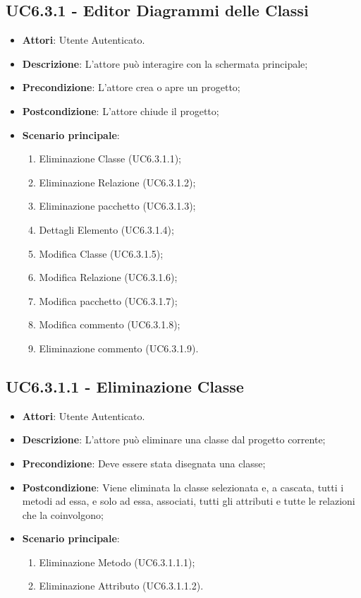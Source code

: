 \subsection{UC6.3.1 - Editor Diagrammi delle Classi} 
\label{ssec:UC6.3.1} 
\begin{itemize} 
\item \textbf{Attori}: Utente Autenticato.
\item \textbf{Descrizione}: L'attore può interagire con la schermata principale;
\item \textbf{Precondizione}: L'attore crea o apre un progetto;
\item \textbf{Postcondizione}: L'attore chiude il progetto;
\item \textbf{Scenario principale}: \begin{enumerate}\item Eliminazione Classe (UC6.3.1.1);\item Eliminazione Relazione (UC6.3.1.2);\item Eliminazione pacchetto (UC6.3.1.3);\item Dettagli Elemento (UC6.3.1.4);\item Modifica Classe (UC6.3.1.5);\item Modifica Relazione (UC6.3.1.6);\item Modifica pacchetto (UC6.3.1.7);\item Modifica commento (UC6.3.1.8);\item Eliminazione commento (UC6.3.1.9). 
 \end{enumerate}
\end{itemize} 
\subsection{UC6.3.1.1 - Eliminazione Classe} 
\label{ssec:UC6.3.1.1} 
\begin{itemize} 
\item \textbf{Attori}: Utente Autenticato.
\item \textbf{Descrizione}: L'attore può eliminare una classe dal progetto corrente;
\item \textbf{Precondizione}: Deve essere stata disegnata una classe;
\item \textbf{Postcondizione}: Viene eliminata la classe selezionata e, a cascata, tutti i metodi ad essa, e solo ad essa, associati, tutti gli attributi e tutte le relazioni che la coinvolgono;
\item \textbf{Scenario principale}: \begin{enumerate}\item Eliminazione Metodo (UC6.3.1.1.1);\item Eliminazione Attributo (UC6.3.1.1.2). 
 \end{enumerate}
\end{itemize} 
